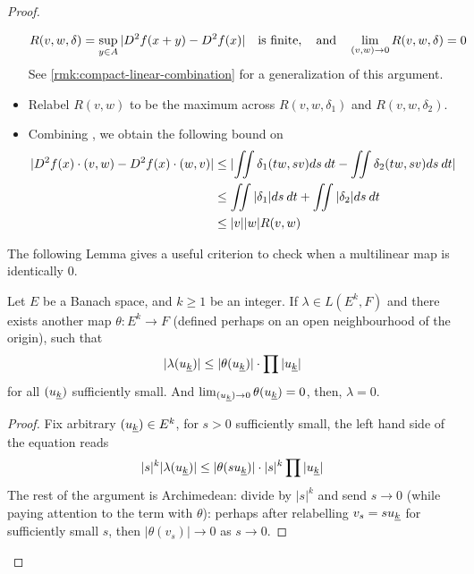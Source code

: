 \documentclass[../main-v2-manifolds.tex]{subfiles}
\begin{document}
\begin{proof}
\begin{note}
\begin{itemize}
        \begin{equation}\label{second-derivative-R}
        R(v,w,\delta) = \sup_{y\in A}\abs{D^2f(x + y) - D^2f(x)}\quad\text{is finite},\qqtext{and}\lim_{(v,w)\to 0}R(v,w,\delta)=0
        \end{equation}
        See \cref{rmk:compact-linear-combination} for a generalization of this argument.
        \item Relabel $R(v,w)$ to be the maximum across $R(v,w,\delta_1)$ and $R(v,w,\delta_2)$. 
        \item Combining , we obtain the following bound on 
        \begin{align}
            \vert {D^2f(x)\cdot(v,w) - D^2f(x)\cdot(w,v)} \vert &\leq \vert {\iint\delta_1(tw,sv) ds\: dt - \iint\delta_2(tw,sv)ds\: dt} \vert\nonumber\\
            &\leq \iint\vert {\delta_1} \vert ds\: dt + \iint\vert {\delta_2} \vert ds\: dt\nonumber \\
            &\leq \vert {v} \vert\vert {w} \vert R(v,w)\label{second-derivative-step3}
        \end{align}
    \end{itemize}
    The following Lemma gives a useful criterion to check when a multilinear map is identically $0$.
    \begin{lemma}
        Let $E$ be a Banach space, and $k\geq 1$ be an integer. If $\lambda\in L(E^k, F)$ and there exists another map $\theta: E^k\to F$ (defined perhaps on an open neighbourhood of the origin), such that
        \[
        \vert \lambda(\UL{u}[k])\vert \leq\vert\theta(\UL{u}[k])\vert\cdot\prod\vert \UL{u}[k]\vert
        \]
        for all $(\UL{u}[k])$ sufficiently small. And $\lim_{(\UL{u}[k]) \to 0}\theta(\UL{u}[k])=0$, then, $\lambda=0$.
    \end{lemma}
    \begin{proof}
        Fix arbitrary $(\UL{u}[k])\in E^k$, for $s>0$ sufficiently small, the left hand side of the equation reads
        \[
            \vert s\vert^k\vert\lambda (\UL{u}[k])\vert\leq\vert\theta(s\UL{u}[k])\vert\cdot\vert s\vert^k\prod \vert\UL{u}[k]\vert
        \]
        The rest of the argument is Archimedean: divide by $\vert s\vert^k$ and send $s\to 0$ (while paying attention to the term with $\theta$): perhaps after relabelling $v_s = s\UL{u}[k]$ for sufficiently small $s$, then $\vert \theta(v_s)\vert\to 0$ as $s\to 0$.
    \end{proof}
        
    \end{note}
    
    

\end{proof}
\end{document}
